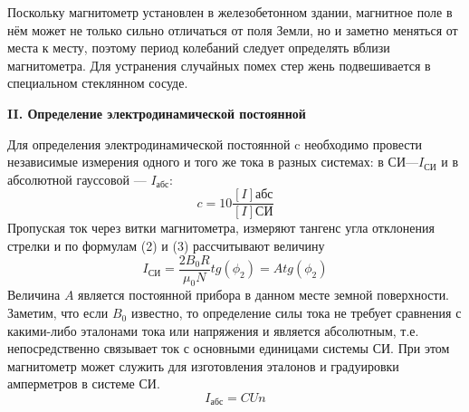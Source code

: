 \documentclass[a4paper, 12pt]{article}%
\begin{document}
	Поскольку магнитометр
	установлен в железобетонном здании, магнитное поле в нём может не только сильно отличаться от поля Земли, но
	и заметно
	меняться от места
	к месту, поэтому период
	колебаний следует определять
	вблизи магнитометра. Для
	устранения случайных помех стер
	жень подвешивается в специальном стеклянном сосуде.
	\begin{center}
		\textbf{II. Определение электродинамической постоянной}
	\end{center}
	Для определения электродинамической постоянной c необходимо провести независимые измерения одного
	и того же тока в разных системах: в СИ—$I_{СИ}$
	и в абсолютной гауссовой — $I_{абс}$:
	\begin{equation}
		c = 10 \frac{[I]абс}{[I]СИ}
	\end{equation}
	Пропуская ток через витки магнитометра, измеряют тангенс угла отклонения
	стрелки и по формулам (2)
	и (3) рассчитывают величину
	\begin{equation}
		I_{СИ} = \frac{2B_0 R}{\mu_0 N} tg(\phi_2) = A tg(\phi_2)
	\end{equation}
	Величина
	$A$ является постоянной прибора в данном месте земной поверхности.
	Заметим, что если $B_0$ известно, то определение силы тока не требует сравнения с какими-либо эталонами тока или напряжения
	и является абсолютным, т.е. непосредственно связывает ток с основными единицами системы СИ. При этом магнитометр может служить для изготовления эталонов
	и
	градуировки амперметров в системе СИ.
	\begin{equation}
		I_{абс} = CUn
	\end{equation}
\end{document}
